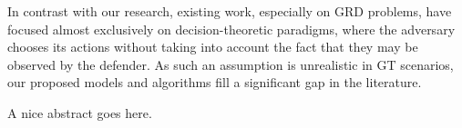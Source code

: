 \begin{center}
In contrast with our research, existing work, especially on GRD problems, have focused almost exclusively on decision-theoretic paradigms, where the adversary chooses its actions without taking into account the fact that they may be observed by the defender. As such an assumption is unrealistic in GT scenarios, our proposed models and algorithms fill a significant gap in the literature.
\end{center}

\noindent
A nice abstract goes here.

